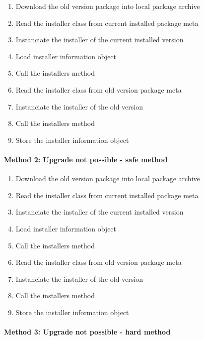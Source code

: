 \begin{enumerate}
\item Download the old version package into local package archive
\item Read the installer class from current installed package meta
\item Instanciate the installer of the current installed version
\item Load installer information object
\item Call the installers  method
\item Read the installer class from old version package meta
\item Instanciate the installer of the old version
\item Call the installers  method
\item Store the installer information object
\end{enumerate}

\paragraph{Method 2: Upgrade not possible - safe method}

\begin{enumerate}
\item Download the old version package into local package archive
\item Read the installer class from current installed package meta
\item Instanciate the installer of the current installed version
\item Load installer information object
\item Call the installers  method
\item Read the installer class from old version package meta
\item Instanciate the installer of the old version
\item Call the installers  method
\item Store the installer information object
\end{enumerate}

\paragraph{Method 3: Upgrade not possible - hard method}


